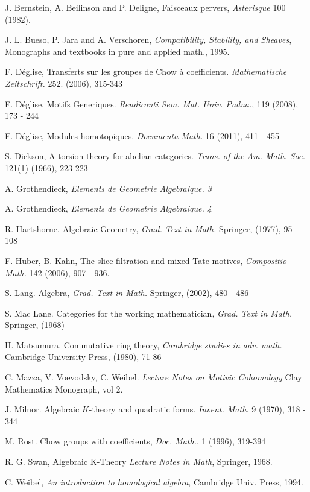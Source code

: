\newpage

\begin{thebibliography}{10}

J. Bernstein, A. Beilinson and P. Deligne,
Faisceaux pervers, {\em Asterisque} 100 (1982).

J. L. Bueso, P. Jara and A. Verschoren,
{\em Compatibility, Stability, and Sheaves}, 
Monographs and textbooks in pure and applied math.,
1995.

F. D\'eglise,
Transferts sur les groupes de Chow \`a coefficients.
{\em Mathematische Zeitschrift.} 252. (2006), 315-343

F. D\'eglise.
Motifs Generiques.
\emph{Rendiconti Sem. Mat. Univ. Padua.}, 119 (2008), 173 - 244

F. D\'eglise, 
Modules homotopiques.
{\em Documenta Math.}
16 (2011), 411 - 455

S. Dickson,
A torsion theory for abelian categories.
{\em Trans. of the Am. Math. Soc.} 121(1) (1966), 223-223

A. Grothendieck,
{\em Elements de Geometrie Algebraique. 3}

A. Grothendieck,
{\em Elements de Geometrie Algebraique. 4}

R. Hartshorne.
Algebraic Geometry, {\em Grad. Text in Math.}
Springer, (1977), 95 - 108

F. Huber, B. Kahn, The slice filtration and mixed Tate motives,
{\em Compositio Math.} 142 (2006), 907 - 936.

S. Lang.
Algebra, {\em Grad. Text in Math.}
Springer, (2002), 480 - 486

S. Mac Lane.
Categories for the working mathematician, {\em Grad. Text in Math.}
Springer, (1968)

H. Matsumura.
Commutative ring theory, {\em Cambridge studies in adv. math.}
Cambridge University Press, (1980), 71-86

C. Mazza, V. Voevodsky, C. Weibel.
{\em Lecture Notes on Motivic Cohomology}
Clay Mathematics Monograph, vol 2.

J. Milnor.
Algebraic $K$-theory and quadratic forms.
{\em Invent. Math.} 9 (1970), 318 - 344

M. Rost.
Chow groups with coefficients,
{\em Doc. Math.}, 1 (1996), 319-394

R. G. Swan,
Algebraic K-Theory
{\em Lecture Notes in Math},
Springer, 1968.

C. Weibel,
{\em An introduction to homological algebra},
Cambridge Univ. Press, 1994.
\end{thebibliography}
